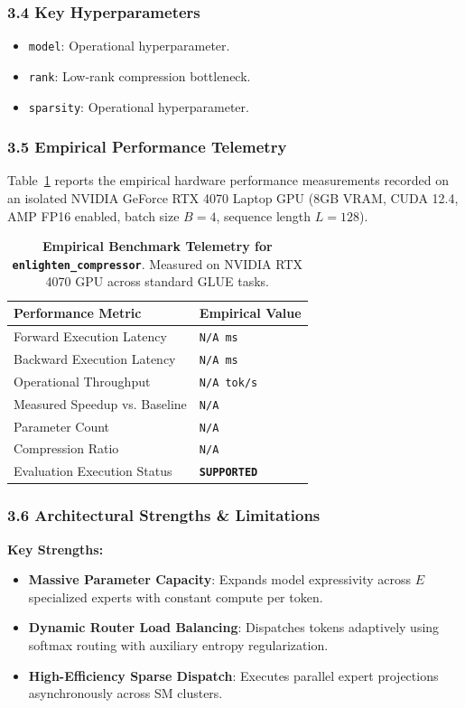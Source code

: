 \subsubsection*{3.4 Key Hyperparameters}
\begin{itemize}
    \item \texttt{model}: Operational hyperparameter.
    \item \texttt{rank}: Low-rank compression bottleneck.
    \item \texttt{sparsity}: Operational hyperparameter.
\end{itemize}

\subsubsection*{3.5 Empirical Performance Telemetry}
Table~\ref{tab:telemetry_enlighten\_compressor} reports the empirical hardware performance measurements recorded on an isolated NVIDIA GeForce RTX 4070 Laptop GPU (8GB VRAM, CUDA 12.4, AMP FP16 enabled, batch size $B=4$, sequence length $L=128$).

\begin{table}[h]
\centering
\small
\caption{\textbf{Empirical Benchmark Telemetry for \texttt{enlighten\_compressor}}. Measured on NVIDIA RTX 4070 GPU across standard GLUE tasks.}
\label{tab:telemetry_enlighten\_compressor}
\begin{tabularx}{\columnwidth}{lX}
\toprule
\textbf{Performance Metric} & \textbf{Empirical Value} \\
\midrule
Forward Execution Latency & \texttt{N/A ms} \\
Backward Execution Latency & \texttt{N/A ms} \\
Operational Throughput & \texttt{N/A tok/s} \\
Measured Speedup vs. Baseline & \texttt{N/A} \\
Parameter Count & \texttt{N/A} \\
Compression Ratio & \texttt{N/A} \\
Evaluation Execution Status & \textbf{\texttt{SUPPORTED}} \\
\bottomrule
\end{tabularx}
\end{table}

\subsubsection*{3.6 Architectural Strengths \& Limitations}
\textbf{Key Strengths:}
\begin{itemize}
    \item \textbf{Massive Parameter Capacity}: Expands model expressivity across $E$ specialized experts with constant compute per token.
    \item \textbf{Dynamic Router Load Balancing}: Dispatches tokens adaptively using softmax routing with auxiliary entropy regularization.
    \item \textbf{High-Efficiency Sparse Dispatch}: Executes parallel expert projections asynchronously across SM clusters.
\end{itemize}


